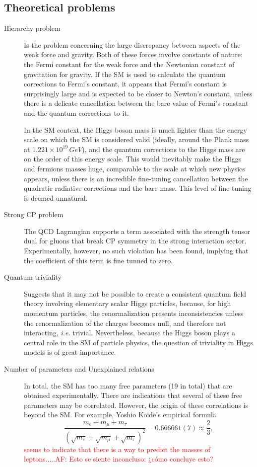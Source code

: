 \subsection{Theoretical problems}

\begin{description}
    \item[Hierarchy problem] Is the problem concerning the large discrepancy between aspects of the weak force and gravity. Both of these forces involve constants of nature: the Fermi constant for the weak force and the Newtonian constant of gravitation for gravity. If the SM is used to calculate the quantum corrections to Fermi's constant, it appears that Fermi's constant is surprisingly large and is expected to be closer to Newton's constant, unless there is a delicate cancellation between the bare value of Fermi's constant and the quantum corrections to it. 
    
    In the SM context, the Higgs boson mass is much lighter than the energy scale on which the SM is considered valid (ideally, around the Plank mass at $1.221\times 10^{19}\,GeV$), and the quantum corrections to the Higgs mass are on the order of this energy scale. This  would inevitably make the Higgs and fermions masses huge, comparable to the scale at which new physics appears, unless there is an incredible fine-tuning cancellation between the quadratic radiative corrections and the bare mass. This level of fine-tuning is deemed unnatural.

    \item[Strong CP problem] The QCD Lagrangian supports a term associated with the strength tensor dual for gluons that break CP symmetry in the strong interaction sector. Experimentally, however, no such violation has been found, implying that the coefficient of this term is fine tunned to zero. 
    \item[Quantum triviality] Suggests that it may not be possible to create a consistent quantum field theory involving elementary scalar Higgs particles, because, for high momentum particles, the renormalization presents inconsistencies unless the renormalization of the charges becomes null, and therefore not interacting, \textit{i.e.} trivial. Nevertheless, because the Higgs boson plays a central role in the SM of particle physics, the question of triviality in Higgs models is of great importance. 
    \item[Number of parameters and Unexplained relations] In total, the SM has too many free parameters (19 in total) that are obtained experimentally. There are indications that several of these free parameters may be correlated. However, the origin of these correlations is beyond the SM. For example, Yoshio Koide's empirical formula~\parencite{0505220}
    $$
    \frac{m_{e}+m_{\mu}+m_{\tau}}{\left(\sqrt{m_{e}}+\sqrt{m_{\mu}}+\sqrt{m_{\tau}}\right)^{2}}=0.666661(7) \approx \frac{2}{3},
    $$
    \textcolor{red}{seems to indicate that there is a way to predict the masses of leptons.....AF: Esto se siente inconcluso: ¿cómo concluye esto?}
    
\end{description}
